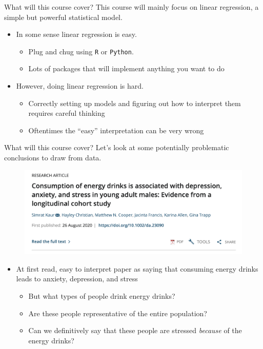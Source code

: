 \documentclass[notheorems,10pt]{beamer}
\begin{document}
\begin{frame}[fragile]{What will this course cover?} 
	This course will mainly focus on linear regression, a simple but powerful statistical model. 
	\begin{itemize}
		\item<1-> In some sense linear regression is easy.
		\begin{itemize}
			\item<1-> Plug and chug using \verb|R| or \verb|Python|.
			\item<1-> Lots of packages that will implement anything you want to do
		\end{itemize}
		\item<2-> However, doing linear regression  is hard.
		\begin{itemize}
			\item<2-> Correctly setting up models and figuring out how to interpret them requires careful thinking
			\item<2-> Oftentimes the ``easy'' interpretation can be very wrong
		\end{itemize}
	\end{itemize}
\end{frame}
\begin{frame}{What will this course cover?} 
	Let's look at some potentially problematic conclusions to draw from data.
	\begin{figure}[htpb]
		\centering
		\includegraphics[width=0.8\linewidth]{energy_drinks.png}
	\end{figure}
	\begin{itemize}
		\item At first read, easy to interpret paper as saying that consuming energy drinks leads to anxiety, depression, and stress
		\begin{itemize}
			\item But what types of people drink energy drinks?
			\item Are these people representative of the entire population?
			\item Can we definitively say that these people are stressed \emph{because} of the energy drinks? 
		\end{itemize}
	\end{itemize}
\end{frame}
\end{document}
